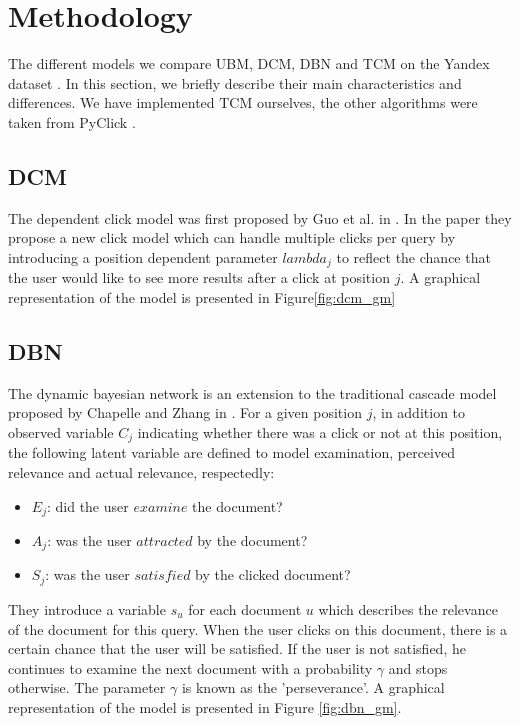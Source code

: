 \section{Methodology}
\label{sec:methodology}
The different models we compare UBM, DCM, DBN and TCM on the Yandex dataset \cite{yandex}. In this section, we briefly describe their main characteristics and differences. We have implemented TCM ourselves, the other algorithms were taken from PyClick \cite{PyClick}.

\subsection{DCM}
The dependent click model was first proposed by Guo et al. in \cite{Guo2009}. In the paper they propose a new click model which can handle multiple clicks per query by introducing a position dependent parameter $lambda_j$ to reflect the chance that the user would like to see more results after a click at position $j$. A graphical representation of the model is presented in Figure\ref{fig:dcm_gm} 

\subsection{DBN}
The dynamic bayesian network is an extension to the traditional cascade model proposed by Chapelle and Zhang in \cite{Zhang2011}. For a given position $j$, in addition to observed variable $C_j$ indicating whether there was a click or not at this position, the following latent variable are defined to model examination, perceived relevance and actual relevance, respectedly:
\begin{itemize}
	\item $E_j$: did the user $examine$ the document?
	\item $A_j$: was the user $attracted$ by the document?
	\item $S_j$: was the user $satisfied$ by the clicked document?
\end{itemize}
They introduce a variable $s_u$ for each document $u$ which describes the relevance of the document for this query. When the user clicks on this document, there is a certain chance that the user will be satisfied. If the user is not satisfied, he continues to examine the next document with a probability $\gamma$ and stops otherwise. The parameter $\gamma$ is known as the 'perseverance'. A graphical representation of the model is presented in Figure \ref{fig:dbn_gm}. 


